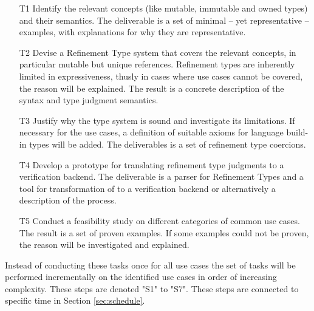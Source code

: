 \documentclass[11pt]{article}
\begin{document}
\begin{itemize}
	\item[T1] Identify the relevant concepts (like mutable, immutable and owned types) and their semantics. The deliverable is a set of minimal -- yet representative -- examples, with explanations for why they are representative.
	\item[T2] Devise a Refinement Type system that covers the relevant concepts, in particular mutable but unique references. Refinement types are inherently limited in expressiveness, thusly in cases where use cases cannot be covered, the reason will be explained. The result is a concrete description of the syntax and type judgment semantics.
	\item[T3] Justify why the type system is sound and investigate its limitations. If necessary for the use cases, a definition of suitable axioms for language build-in types will be added. The deliverables is a set of refinement type coercions.
	\item[T4] Develop a prototype for translating refinement type judgments to a verification backend. The deliverable is a parser for Refinement Types and a tool for transformation of to a verification backend or alternatively a description of the process.
	\item[T5] Conduct a feasibility study on different categories of common use cases. The result is a set of proven examples. If some examples could not be proven, the reason will be investigated and explained.
\end{itemize}

Instead of conducting these tasks once for all use cases the set of tasks will be performed incrementally on the identified use cases in order of increasing complexity. These steps are denoted "S1" to "S7". These steps are connected to specific time in Section \ref{sec:schedule}.
\end{document}
